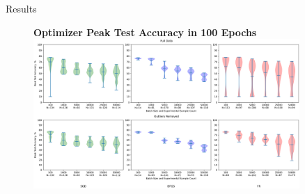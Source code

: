 \documentclass[final]{beamer}
\newlength{\sepwidth}
\newlength{\colwidth}
\newcommand{\separatorcolumn}{\begin{column}{\sepwidth}\end{column}}
\begin{document}
\begin{frame}[t]
\begin{columns}[t]
\begin{column}{\colwidth}
    \end{column}

    \separatorcolumn

    \begin{column}{\colwidth}

      \begin{block}{Results}
        \begin{figure}
          \centering
          \textbf{Optimizer Peak Test Accuracy in 100 Epochs}
          \includegraphics[width=\columnwidth]{peak_acc_violin_comparison.png}
        \end{figure}


\end{block}
\end{column}
\end{columns}
\end{frame}
\end{document}
